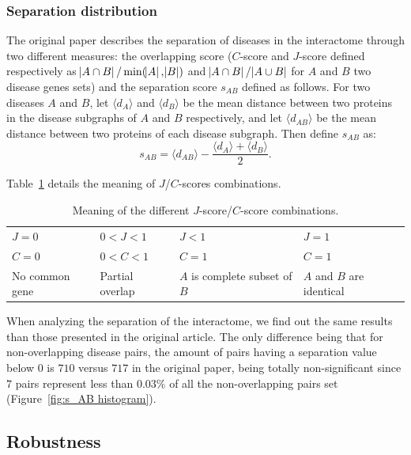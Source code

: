 \documentclass[letterpaper]{article}
\begin{document}
		\subsubsection{Separation distribution}
		The original paper describes the separation of diseases in the interactome through two different measures:
		the overlapping score ($C$-score and $J$-score defined respectively as $\abs {A \cap B}/\min(\abs A, \abs B)$
		and $\abs {A \cap B}/\abs {A \cup B}$ for $A$ and $B$ two disease genes sets) and the separation score $s_{AB}$
		defined as follows. For two diseases $A$ and $B$, let $\langle d_A \rangle$ and $\langle d_B \rangle$ be the mean
		distance between two proteins in the disease subgraphs of $A$ and $B$ respectively, and let $\langle d_{AB} \rangle$
		be the mean distance between two proteins of each disease subgraph. Then define $s_{AB}$ as:
		\begin{equation}
			s_{AB} = \langle d_{AB} \rangle - \frac {\langle d_A \rangle + \langle d_B \rangle}{2}.
		\end{equation}

		Table~\ref{tab:J-C-scores} details the meaning of $J$/$C$-scores combinations.

		\begin{table}
		\begin{tabular}{m{}|m{}|m{}|m{}}
			$J = 0$ & $0 < J < 1$ & $J < 1$ & $J = 1$ \\
			$C = 0$ & $0 < C < 1$ & $C = 1$ & $C = 1$ \\
			\hline
			\hline
			No common gene & Partial overlap & $A$ is complete subset of $B$ & $A$ and $B$ are identical
		\end{tabular}
		\caption{Meaning of the different $J$-score/$C$-score combinations.\label{tab:J-C-scores}}
		\end{table}

		When analyzing the separation of the interactome, we find out the same results than those presented in the
		original article. The only difference being that for non-overlapping disease pairs, the amount of pairs
		having a separation value below 0 is $710$ versus $717$ in the original paper, being totally non-significant
		since $7$ pairs represent less than $0.03\%$ of all the non-overlapping pairs set (Figure~\ref{fig:s_AB histogram}).

	\subsection{Robustness}
\end{document}
